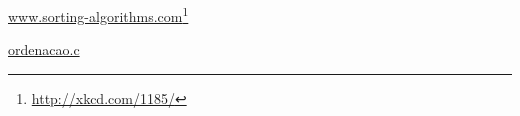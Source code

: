 \begin{frame}[label=main]
	\begin{center}
	\Huge \href{http://www.sorting-algorithms.com/random-initial-order}{www.sorting-algorithms.com}\footnotesize{\footnote{\href{http://xkcd.com/1185/}{http://xkcd.com/1185/}}}
	\end{center}
	\vfill
	\begin{center}
	\Huge \href{$HOME/workspace/ED/ordenacao/ordenacao.c}{ordenacao.c}
	\end{center}
\end{frame}